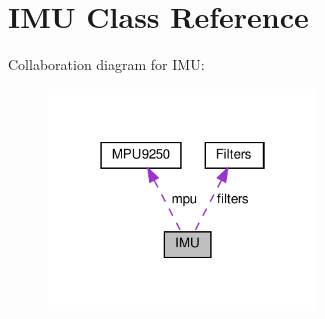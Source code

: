 \hypertarget{class_i_m_u}{}\section{I\+MU Class Reference}
\label{class_i_m_u}


Collaboration diagram for I\+MU\+:
\nopagebreak
\begin{figure}[H]
\begin{center}
\leavevmode
\includegraphics[width=202pt]{class_i_m_u__coll__graph}
\end{center}
\end{figure}
